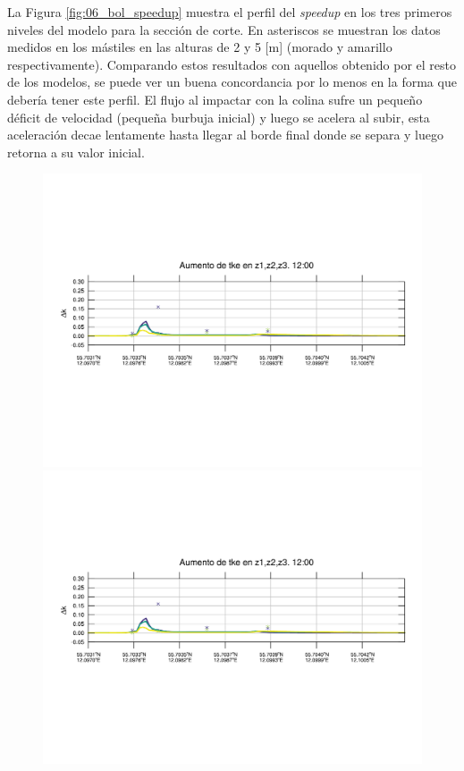 La Figura \ref{fig:06_bol_speedup} muestra el perfil del \emph{speedup} en los tres primeros niveles del modelo para la sección de corte. En asteriscos se muestran los datos medidos en los mástiles en las alturas de 2 y 5 [m] (morado y amarillo respectivamente). Comparando estos resultados con aquellos obtenido por el resto de los modelos, se puede ver un buena concordancia por lo menos en la forma que debería tener este perfil. El flujo al impactar con la colina sufre un pequeño déficit de velocidad (pequeña burbuja inicial) y luego se acelera al subir, esta aceleración decae lentamente hasta llegar al borde final donde se separa y luego retorna a su valor inicial. 

\begin{figure}[H]
	\centering
	\includegraphics[width=0.90\linewidth,trim={12mm 84mm 10mm 74mm},page=1,clip]{Imagenes/06/bol/delta_tke}\\%
	\includegraphics[width=0.90\linewidth,trim={12mm 84mm 10mm 74mm},page=13,clip]{Imagenes/06/bol/delta_tke}\\%

\end{figure}
